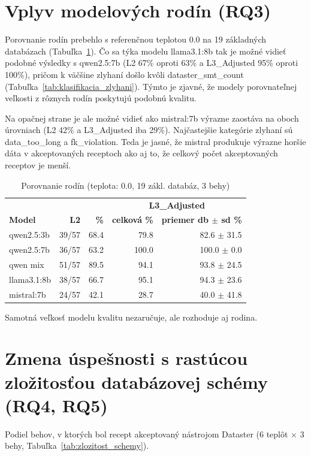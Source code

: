 \section{Vplyv modelových rodín (RQ3)}

Porovnanie rodín prebehlo s referenčnou teplotou 0.0 na 19 základných databázach (Tabuľka~\ref{tab:vysledky_rodina}). Čo sa týka modelu llama3.1:8b tak je možné vidieť podobné výsledky s qwen2.5:7b (L2 67\% oproti 63\% a L3\_Adjusted 95\% oproti 100\%), pričom k väčšine zlyhaní došlo kvôli dataster\_smt\_count (Tabuľka~\ref{tab:klasifikacia_zlyhani}). Týmto je zjavné, že modely porovnateľnej veľkosti  z rôznych rodín poskytujú podobnú kvalitu.


Na opačnej strane je ale možné vidieť ako mistral:7b výrazne zaostáva na oboch úrovniach (L2 42\% a L3\_Adjusted iba 29\%). Najčastejšie kategórie zlyhaní sú data\_too\_long a fk\_violation. Teda je jasné, že mistral produkuje výrazne horšie dáta v akceptovaných receptoch ako aj to, že celkový počet akceptovaných receptov je menší. 

\begin{table}[H]
    \centering
    \small
    \begin{tabular}{l r r r r} 
    \toprule
    & & &  \multicolumn{2}{c}{\textbf{L3\_Adjusted}} \\
    \textbf{Model} & \textbf{L2} & \textbf{\%}  & \textbf{celková \%} & \textbf{priemer db $\pm$ sd \%} \\\midrule
    
        qwen2.5:3b & 39/57 & 68.4 & 79.8 & 82.6 $\pm$ 31.5 \\
        qwen2.5:7b & 36/57 & 63.2 & 100.0 & 100.0 $\pm$ 0.0 \\
        qwen mix & 51/57 & 89.5 & 94.1 & 93.8 $\pm$ 24.5 \\
        llama3.1:8b & 38/57 & 66.7 & 95.1 & 94.3 $\pm$ 23.6 \\
        mistral:7b & 24/57 & 42.1 & 28.7 & 40.0 $\pm$ 41.8 \\
    \bottomrule
    \end{tabular}
    \caption{Porovnanie rodín (teplota: 0.0, 19 zákl. databáz, 3 behy)}
    \label{tab:vysledky_rodina}
\end{table}



Samotná veľkosť modelu kvalitu nezaručuje, ale rozhoduje aj rodina.

\section{Zmena úspešnosti s rastúcou zložitosťou databázovej schémy (RQ4, RQ5)}
Podiel behov, v ktorých bol recept akceptovaný nástrojom Dataster (6 teplôt $\times$ 3 behy, Tabuľka~\ref{tab:zlozitost_schemy}).

